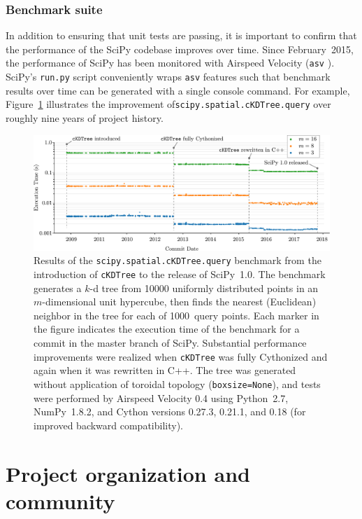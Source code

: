 \documentclass[fleqn,10pt]{wlscirep}
\begin{document}
\subsubsection*{Benchmark suite}

In addition to ensuring that unit tests are passing, it is important to confirm that
the performance of the SciPy codebase improves over time. Since February~2015, the
performance of SciPy has been monitored with Airspeed Velocity (\texttt{asv} \cite{asvref}).
SciPy's \texttt{run.py} script conveniently wraps \texttt{asv} features such that benchmark
results over time can be generated with a single console command. For example,
Figure~\ref{fig:asvbench} illustrates the improvement of\texttt{scipy.spatial.cKDTree.query}
over roughly nine years of project history.

\begin{figure}[H]
\centering
\includegraphics[width=\textwidth]{static/asv}
\caption{Results of the \texttt{scipy.spatial.cKDTree.query} benchmark from the introduction of \texttt{cKDTree} to the release of SciPy~1.0. The benchmark generates a $k$-d tree from \num{10000} uniformly distributed points in an $m$-dimensional unit hypercube, then finds the nearest (Euclidean) neighbor in the tree for each of \num{1000}~query points. Each marker in the figure indicates the execution time of the benchmark for a commit in the master branch of SciPy. Substantial performance improvements were realized when \texttt{cKDTree} was fully Cythonized and again when it was rewritten in C++. The tree was generated without application of toroidal topology (\texttt{boxsize=None}), and tests were performed by Airspeed Velocity 0.4 using Python~2.7, NumPy~1.8.2, and Cython versions 0.27.3, 0.21.1, and 0.18 (for improved backward compatibility).}
\label{fig:asvbench}
\end{figure}

\section*{Project organization and community}
\end{document}
